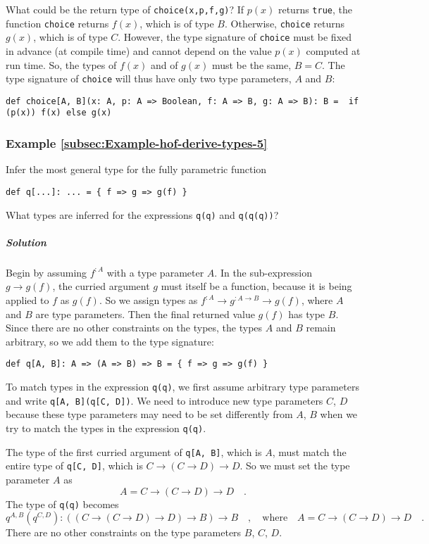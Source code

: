 What could be the return type of \lstinline!choice(x,p,f,g)!? If
$p(x)$ returns \lstinline!true!, the function \lstinline!choice!
returns $f(x)$, which is of type $B$. Otherwise, \lstinline!choice!
returns $g(x)$, which is of type $C$. However, the type signature
of \lstinline!choice! must be fixed in advance (at compile time)
and cannot depend on the value $p(x)$ computed at run time. So, the
types of $f(x)$ and of $g(x)$ must be the same, $B=C$. The type
signature of \lstinline!choice! will thus have only two type parameters,
$A$ and $B$:
\begin{lstlisting}
def choice[A, B](x: A, p: A => Boolean, f: A => B, g: A => B): B =  if (p(x)) f(x) else g(x)
\end{lstlisting}


\subsubsection{Example \label{subsec:Example-hof-derive-types-5}\ref{subsec:Example-hof-derive-types-5}}

Infer the most general type for the fully parametric function
\begin{lstlisting}
def q[...]: ... = { f => g => g(f) }
\end{lstlisting}
What types are inferred for the expressions \lstinline!q(q)! and
\lstinline!q(q(q))!?

\subparagraph{Solution}

Begin by assuming $f^{:A}$ with a type parameter $A$. In the sub-expression
$g\rightarrow g(f)$, the curried argument $g$ must itself be a function,
because it is being applied to $f$ as $g(f)$. So we assign types
as $f^{:A}\rightarrow g^{:A\rightarrow B}\rightarrow g(f)$, where
$A$ and $B$ are type parameters. Then the final returned value $g(f)$
has type $B$. Since there are no other constraints on the types,
the types $A$ and $B$ remain arbitrary, so we add them to the type
signature:
\begin{lstlisting}
def q[A, B]: A => (A => B) => B = { f => g => g(f) }
\end{lstlisting}

To match types in the expression \lstinline!q(q)!, we first assume
arbitrary type parameters and write \lstinline!q[A, B](q[C, D])!.
We need to introduce new type parameters $C$, $D$ because these
type parameters may need to be set differently from $A$, $B$ when
we try to match the types in the expression \lstinline!q(q)!.

The type of the first curried argument of \lstinline!q[A, B]!, which
is $A$, must match the entire type of \lstinline!q[C, D]!, which
is $C\rightarrow\left(C\rightarrow D\right)\rightarrow D$. So we
must set the type parameter $A$ as
\[
A=C\rightarrow\left(C\rightarrow D\right)\rightarrow D\quad.
\]
The type of \lstinline!q(q)! becomes
\[
q^{A,B}(q^{C,D}):\left(\left(C\rightarrow\left(C\rightarrow D\right)\rightarrow D\right)\rightarrow B\right)\rightarrow B\quad,\quad\text{where}\quad A=C\rightarrow\left(C\rightarrow D\right)\rightarrow D\quad.
\]
There are no other constraints on the type parameters $B$, $C$,
$D$.

